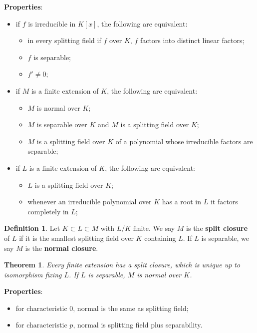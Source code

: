 \documentclass[11pt]{amsart}
\newtheorem*{theorem*}{Theorem}
\theoremstyle{definition}
\newtheorem*{definition*}{Definition}
\renewcommand\:{\colon}
\newcommand{\1}{\mathds{1}}
\begin{document}
\noindent \textbf{Properties}:
\begin{itemize}[leftmargin=*]\setlength\itemsep{0em}
	\item if $f$ is irreducible in $K[x]$, the following are equivalent:
	\begin{itemize}[leftmargin=*]\setlength\itemsep{0em}
		\item in every splitting field if $f$ over $K$, $f$ factors into distinct linear factors;
		\item $f$ is separable;
		\item $f' \neq 0$;
	\end{itemize}
	\item if $M$ is a finite extension of $K$, the following are equivalent:
	\begin{itemize}[leftmargin=12.5pt]\setlength\itemsep{0em}
		\item $M$ is normal over $K$;
		\item $M$ is separable over $K$ and $M$ is a splitting field over $K$;
		\item $M$ is a splitting field over $K$ of a polynomial whose irreducible factors are separable;
	\end{itemize}
	\item if $L$ is a finite extension of $K$, the following are equivalent:
	\begin{itemize}[leftmargin=12.5pt]\setlength\itemsep{0em}
		\item $L$ is a splitting field over $K$;
		\item whenever an irreducible polynomial over $K$ has a root in $L$ it factors completely in $L$;
	\end{itemize}
\end{itemize}

\begin{definition*}
	Let $K \subset L \subset M$ with $L/K$ finite. We say $M$ is the \textbf{split closure} of $L$ if it is the smallest splitting field over $K$ containing $L$. If $L$ is separable, we say $M$ is the \textbf{normal closure}.
\end{definition*}

\begin{theorem*}
	Every finite extension has a split closure, which is unique up to isomorphism fixing $L$. If $L$ is separable, $M$ is normal over $K$.
\end{theorem*}

\noindent \textbf{Properties}:
\begin{itemize}[leftmargin=*]\setlength\itemsep{0em}
	\item for characteristic 0, normal is the same as splitting field;
	\item for characteristic $p$, normal is splitting field plus separability.
\end{itemize}
\end{document}
